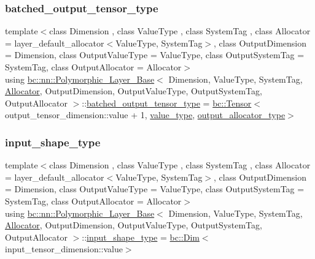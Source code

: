 \subsubsection{\texorpdfstring{batched\+\_\+output\+\_\+tensor\+\_\+type}{batched\_output\_tensor\_type}\hspace{0.1cm}{\footnotesize\ttfamily [2/2]}}
{\footnotesize\ttfamily template$<$class Dimension , class Value\+Type , class System\+Tag , class Allocator  = layer\+\_\+default\+\_\+allocator$<$\+Value\+Type, System\+Tag$>$, class Output\+Dimension  = Dimension, class Output\+Value\+Type  = Value\+Type, class Output\+System\+Tag  = System\+Tag, class Output\+Allocator  = Allocator$>$ \\
using \hyperlink{structbc_1_1nn_1_1Polymorphic__Layer__Base}{bc\+::nn\+::\+Polymorphic\+\_\+\+Layer\+\_\+\+Base}$<$ Dimension, Value\+Type, System\+Tag, \hyperlink{classbc_1_1allocators_1_1Allocator}{Allocator}, Output\+Dimension, Output\+Value\+Type, Output\+System\+Tag, Output\+Allocator $>$\+::\hyperlink{structbc_1_1nn_1_1Polymorphic__Layer__Base_a45ed57549be9c4e5c40c52168ca15ae9}{batched\+\_\+output\+\_\+tensor\+\_\+type} =  \hyperlink{namespacebc_a659391e47ab612be3ba6c18cf9c89159}{bc\+::\+Tensor}$<$output\+\_\+tensor\+\_\+dimension\+::value + 1, \hyperlink{structbc_1_1nn_1_1Polymorphic__Layer__Base_aa7d46845ee0a4544003a6f8fe3b7f52a}{value\+\_\+type}, \hyperlink{structbc_1_1nn_1_1Polymorphic__Layer__Base_a4bc904c1787b9da18e35d0c6b60ac59f}{output\+\_\+allocator\+\_\+type}$>$}

\mbox{\label{structbc_1_1nn_1_1Polymorphic__Layer__Base_ad69ba46ce14f9fbef88b834828052ab4}} 
\subsubsection{\texorpdfstring{input\+\_\+shape\+\_\+type}{input\_shape\_type}\hspace{0.1cm}{\footnotesize\ttfamily [1/2]}}
{\footnotesize\ttfamily template$<$class Dimension , class Value\+Type , class System\+Tag , class Allocator  = layer\+\_\+default\+\_\+allocator$<$\+Value\+Type, System\+Tag$>$, class Output\+Dimension  = Dimension, class Output\+Value\+Type  = Value\+Type, class Output\+System\+Tag  = System\+Tag, class Output\+Allocator  = Allocator$>$ \\
using \hyperlink{structbc_1_1nn_1_1Polymorphic__Layer__Base}{bc\+::nn\+::\+Polymorphic\+\_\+\+Layer\+\_\+\+Base}$<$ Dimension, Value\+Type, System\+Tag, \hyperlink{classbc_1_1allocators_1_1Allocator}{Allocator}, Output\+Dimension, Output\+Value\+Type, Output\+System\+Tag, Output\+Allocator $>$\+::\hyperlink{structbc_1_1nn_1_1Polymorphic__Layer__Base_ad69ba46ce14f9fbef88b834828052ab4}{input\+\_\+shape\+\_\+type} =  \hyperlink{structbc_1_1Dim}{bc\+::\+Dim}$<$input\+\_\+tensor\+\_\+dimension\+::value$>$}

